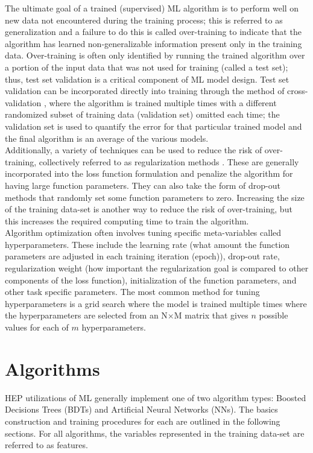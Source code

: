 The ultimate goal of a trained (supervised) ML algorithm is to perform well on new data not encountered during the training process; this is referred to as generalization and a failure to do this is called over-training to indicate that the algorithm has learned non-generalizable information present only in the training data. Over-training is often only identified by running the trained algorithm over a portion of the input data that was not used for training (called a test set); thus, test set validation is a critical component of ML model design. Test set validation can be incorporated directly into training through the method of cross-validation \cite{cross-val}, where the algorithm is trained multiple times with a different randomized subset of training data (validation set) omitted each time; the validation set is used to quantify the error for that particular trained model and the final algorithm is an average of the various models.\\ 

Additionally, a variety of techniques can be used to reduce the risk of over-training, collectively referred to as regularization methods \cite{regularization}. These are generally incorporated into the loss function formulation and penalize the algorithm for having large function parameters. They can also take the form of drop-out methods that randomly set some function parameters to zero. Increasing the size of the training data-set is another way to reduce the risk of over-training, but this increases the required computing time to train the algorithm.\\ 

Algorithm optimization often involves tuning specific meta-variables called hyperparameters. These include the learning rate (what amount the function parameters are adjusted in each training iteration (epoch)), drop-out rate, regularization weight (how important the regularization goal is compared to other components of the loss function), initialization of the function parameters, and other task specific parameters. The most common method for tuning hyperparameters is a grid search where the model is trained multiple times where the hyperparameters are selected from an N$\times$M matrix that gives $n$ possible values for each of $m$ hyperparameters.

\section{Algorithms}\label{sec:algs}
HEP utilizations of ML generally implement one of two algorithm types: Boosted Decisions Trees (BDTs) and Artificial Neural Networks (NNs). The basics construction and training procedures for each are outlined in the following sections. For all algorithms, the variables represented in the training data-set are referred to as features.

